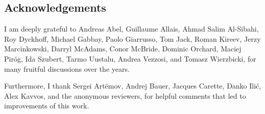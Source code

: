 \documentclass{entcs}
\renewcommand{\:}{\mathrel{:}}
\renewcommand{\;}{\mathbin{;}}
\begin{document}
\subsection*{Acknowledgements}

I am deeply grateful to Andreas Abel, Guillaume Allais, Ahmad Salim Al-Sibahi, Roy Dyckhoff, Michael Gabbay, Paolo Giarrusso, Tom Jack, Roman Kireev, Jerzy Marcinkowski, Darryl McAdams, Conor McBride, Dominic Orchard, Maciej Pir\'{o}g, Ida Szubert, Tarmo Uustalu, Andrea Vezzosi, and Tomasz Wierzbicki, for many fruitful discussions over the years.

Furthermore, I thank Sergei Art\"{e}mov, Andrej Bauer, Jacques Carette, Danko Ili\'{c}, Alex Kavvos, and the anonymous reviewers, for helpful comments that led to improvements of this work.






\end{document}
